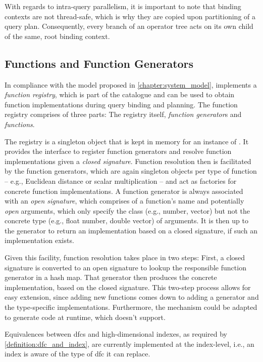 With regards to intra-query parallelism, it is important to note that binding contexts are not thread-safe, which is why they are copied upon partitioning of a query plan. Consequently, every branch of an operator tree acts on its own child of the same, root binding context.

\subsection{Functions and Function Generators}

In compliance with the model proposed in \cref{chapter:system_model}, \cottontail{} implements a \emph{function registry}, which is part of the catalogue and can be used to obtain function implementations during query binding and planning. The function registry comprises of three parts: The registry itself, \emph{function generator}s and \emph{functions}.

The registry is a singleton object that is kept in memory for an instance of \cottontail{}. It provides the interface to register function generators and resolve function implementations given a \emph{closed signature}. Function resolution then is facilitated by the function generators, which are again singleton objects per type of function -- e.g., Euclidean distance or scalar multiplication -- and act as factories for concrete function implementations. A function generator is always associated with an \emph{open signature}, which comprises of a function's name and potentially \emph{open} arguments, which only specify the class (e.g., number, vector) but not the concrete type (e.g., float number, double vector) of arguments. It is then up to the generator to return an implementation based on a closed signature, if such an implementation exists.

Given this facility, function resolution takes place in two steps: First, a closed signature is converted to an open signature to lookup the responsible function generator in a hash map. That generator then produces the concrete implementation, based on the closed signature. This two-step process allows for easy extension, since adding new functions comes down to adding a generator and the type-specific implementations. Furthermore, the mechanism could be adapted to generate code at runtime, which \cottontail{} doesn't support.

Equivalences between \acrshort{dfc}s and high-dimensional indexes, as required by \cref{definition:dfc_and_index}, are currently implemented at the index-level, i.e., an index is aware of the type of \acrshort{dfc} it can replace.

